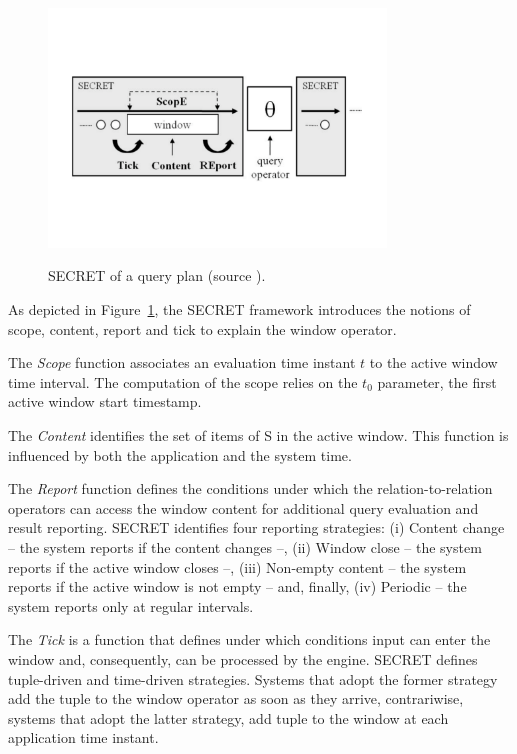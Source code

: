 \begin{figure}[t]
  \begin{center}
    \includegraphics[width=0.8\textwidth]{img/secret}\\
    \caption{SECRET of a query plan (source \cite{DBLP:journals/pvldb/BotanDDHMT10}).}
    \label{fig:secret}
  \end{center}
\end{figure}

As depicted in Figure~\ref{fig:secret}, the SECRET framework introduces the notions of scope, content, report and tick to explain the window operator.

The \textit{Scope} function associates an evaluation time instant $t$ to the active window time interval. The computation of the scope relies on the $t_0$ parameter, the first active window start timestamp.

The \textit{Content} identifies the set of items of S in the active window. This function is influenced by both the application and the system time.

The \textit{Report} function defines the conditions under which the relation-to-relation operators can access the window content for additional query evaluation and result reporting. SECRET identifies four reporting strategies: (i) Content change -- the system reports if the content changes --, (ii)  Window close -- the system reports if the active window closes --, (iii) Non-empty content -- the system reports if the active window is not empty -- and, finally, (iv) Periodic -- the system reports only at regular intervals.

The \textit{Tick} is a function that defines under which conditions input can enter the window and, consequently, can be processed by the engine. SECRET defines tuple-driven and time-driven strategies. Systems that adopt the former strategy add the tuple to the window operator as soon as they arrive, contrariwise, systems that adopt the latter strategy, add tuple to the window at each application time instant.

